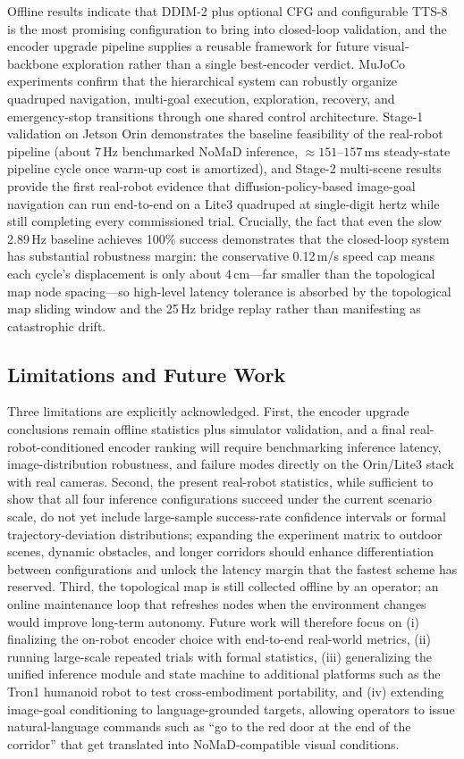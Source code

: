 \begin{digest}[en]
Offline results indicate that DDIM-2 plus optional CFG and configurable TTS-8 is the
most promising configuration to bring into closed-loop validation, and the encoder
upgrade pipeline supplies a reusable framework for future visual-backbone exploration
rather than a single best-encoder verdict. MuJoCo experiments confirm that the
hierarchical system can robustly organize quadruped navigation, multi-goal execution,
exploration, recovery, and emergency-stop transitions through one shared control
architecture. Stage-1 validation on Jetson Orin demonstrates the baseline
feasibility of the real-robot pipeline (about 7\,Hz benchmarked NoMaD inference,
$\approx 151$--$157\,\mathrm{ms}$ steady-state pipeline cycle once warm-up cost is
amortized), and Stage-2 multi-scene results provide the first real-robot evidence
that diffusion-policy-based image-goal navigation can run end-to-end on a Lite3
quadruped at single-digit hertz while still completing every commissioned trial.
Crucially, the fact that even the slow 2.89\,Hz baseline achieves 100\% success
demonstrates that the closed-loop system has substantial robustness margin: the
conservative 0.12\,m/s speed cap means each cycle's displacement is only about
4\,cm---far smaller than the topological map node spacing---so high-level latency tolerance is
absorbed by the topological map sliding window and the 25\,Hz bridge replay rather than
manifesting as catastrophic drift.

\subsection*{Limitations and Future Work}

Three limitations are explicitly acknowledged. First, the encoder upgrade conclusions
remain offline statistics plus simulator validation, and a final
real-robot-conditioned encoder ranking will require benchmarking inference latency,
image-distribution robustness, and failure modes directly on the Orin/Lite3 stack with
real cameras. Second, the present real-robot statistics, while sufficient to show that
all four inference configurations succeed under the current scenario scale, do not yet
include large-sample success-rate confidence intervals or formal trajectory-deviation
distributions; expanding the experiment matrix to outdoor scenes, dynamic obstacles,
and longer corridors should enhance differentiation between configurations and unlock
the latency margin that the fastest scheme has reserved. Third, the topological map is still
collected offline by an operator; an online maintenance loop that refreshes nodes when
the environment changes would improve long-term autonomy. Future work will therefore
focus on (i) finalizing the on-robot encoder choice with end-to-end real-world
metrics, (ii) running large-scale repeated trials with formal statistics, (iii)
generalizing the unified inference module and state machine to additional platforms
such as the Tron1 humanoid robot to test cross-embodiment portability, and (iv)
extending image-goal conditioning to language-grounded targets, allowing operators to
issue natural-language commands such as ``go to the red door at the end of the
corridor'' that get translated into NoMaD-compatible visual conditions.


\end{digest}
